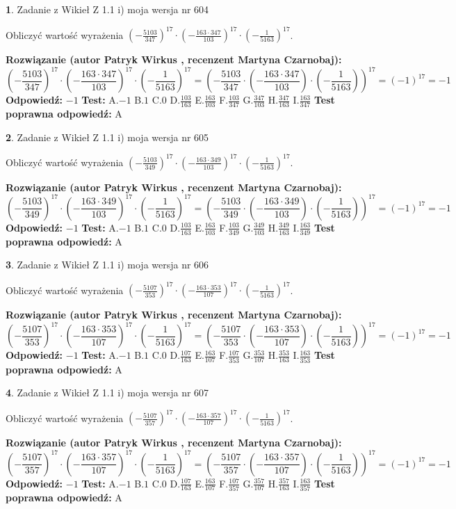 \documentclass[12pt, a4paper]{article}
\theoremstyle{definition} %
\newtheorem{zad}{}
\newcommand{\zadStart}[1]{\begin{zad}#1\newline}
\newcommand{\zadStop}{\end{zad}}
\newcommand{\rozwStart}[2]{\noindent \textbf{Rozwiązanie (autor #1 , recenzent #2): }\newline}
\newcommand{\rozwStop}{\newline}
\newcommand{\odpStart}{\noindent \textbf{Odpowiedź:}\newline}
\newcommand{\odpStop}{\newline}
\newcommand{\testStart}{\noindent \textbf{Test:}\newline}
\newcommand{\testStop}{\newline}
\newcommand{\kluczStart}{\noindent \textbf{Test poprawna odpowiedź:}\newline}
\newcommand{\kluczStop}{\newline}
\begin{document}
\zadStart{Zadanie z Wikieł Z 1.1 i) moja wersja nr 604}

Obliczyć wartość wyrażenia $(-\frac{5103}{347})^{17} \cdot (-\frac{163 \cdot 347}{103})^{17} \cdot (-\frac{1}{5163})^{17}$.
\zadStop
\rozwStart{Patryk Wirkus}{Martyna Czarnobaj}
$$(-\frac{5103}{347})^{17} \cdot (-\frac{163 \cdot 347}{103})^{17} \cdot (-\frac{1}{5163})^{17} = (-\frac{5103}{347} \cdot (-\frac{163 \cdot 347}{103}) \cdot (-\frac{1}{5163}))^{17} = (-1)^{17} = -1$$
\rozwStop
\odpStart
$-1$
\odpStop
\testStart
A.$-1$ B.$1$ C.$0$ D.$\frac{103}{163}$ E.$\frac{163}{103}$
F.$\frac{103}{347}$ G.$\frac{347}{103}$
H.$\frac{347}{163}$
I.$\frac{163}{347}$
\testStop
\kluczStart
A
\kluczStop



\zadStart{Zadanie z Wikieł Z 1.1 i) moja wersja nr 605}

Obliczyć wartość wyrażenia $(-\frac{5103}{349})^{17} \cdot (-\frac{163 \cdot 349}{103})^{17} \cdot (-\frac{1}{5163})^{17}$.
\zadStop
\rozwStart{Patryk Wirkus}{Martyna Czarnobaj}
$$(-\frac{5103}{349})^{17} \cdot (-\frac{163 \cdot 349}{103})^{17} \cdot (-\frac{1}{5163})^{17} = (-\frac{5103}{349} \cdot (-\frac{163 \cdot 349}{103}) \cdot (-\frac{1}{5163}))^{17} = (-1)^{17} = -1$$
\rozwStop
\odpStart
$-1$
\odpStop
\testStart
A.$-1$ B.$1$ C.$0$ D.$\frac{103}{163}$ E.$\frac{163}{103}$
F.$\frac{103}{349}$ G.$\frac{349}{103}$
H.$\frac{349}{163}$
I.$\frac{163}{349}$
\testStop
\kluczStart
A
\kluczStop



\zadStart{Zadanie z Wikieł Z 1.1 i) moja wersja nr 606}

Obliczyć wartość wyrażenia $(-\frac{5107}{353})^{17} \cdot (-\frac{163 \cdot 353}{107})^{17} \cdot (-\frac{1}{5163})^{17}$.
\zadStop
\rozwStart{Patryk Wirkus}{Martyna Czarnobaj}
$$(-\frac{5107}{353})^{17} \cdot (-\frac{163 \cdot 353}{107})^{17} \cdot (-\frac{1}{5163})^{17} = (-\frac{5107}{353} \cdot (-\frac{163 \cdot 353}{107}) \cdot (-\frac{1}{5163}))^{17} = (-1)^{17} = -1$$
\rozwStop
\odpStart
$-1$
\odpStop
\testStart
A.$-1$ B.$1$ C.$0$ D.$\frac{107}{163}$ E.$\frac{163}{107}$
F.$\frac{107}{353}$ G.$\frac{353}{107}$
H.$\frac{353}{163}$
I.$\frac{163}{353}$
\testStop
\kluczStart
A
\kluczStop



\zadStart{Zadanie z Wikieł Z 1.1 i) moja wersja nr 607}

Obliczyć wartość wyrażenia $(-\frac{5107}{357})^{17} \cdot (-\frac{163 \cdot 357}{107})^{17} \cdot (-\frac{1}{5163})^{17}$.
\zadStop
\rozwStart{Patryk Wirkus}{Martyna Czarnobaj}
$$(-\frac{5107}{357})^{17} \cdot (-\frac{163 \cdot 357}{107})^{17} \cdot (-\frac{1}{5163})^{17} = (-\frac{5107}{357} \cdot (-\frac{163 \cdot 357}{107}) \cdot (-\frac{1}{5163}))^{17} = (-1)^{17} = -1$$
\rozwStop
\odpStart
$-1$
\odpStop
\testStart
A.$-1$ B.$1$ C.$0$ D.$\frac{107}{163}$ E.$\frac{163}{107}$
F.$\frac{107}{357}$ G.$\frac{357}{107}$
H.$\frac{357}{163}$
I.$\frac{163}{357}$
\testStop
\kluczStart
A
\kluczStop
\end{document}
